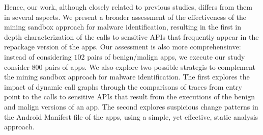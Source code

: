 Hence, our work, although closely related to previous studies, differs from them in several aspects. We present a broader assessment of the effectiveness of the mining sandbox approach for malware identification, resulting in the first in depth characterization of the calls to sensitive APIs that frequently appear in the repackage version of the apps. Our assessment is also more comprehensinve: instead of considering $102$ pairs of benign/malign apps, we execute our study consider {\color{red}800} pairs of apps. We also explore two possible strategis to complement the mining sandbox approach for malware identification. The first explores the impact of dynamic call graphs through the comparisons of traces from entry point to the calls to sensitive APIs that result from the executions of the benign and malign versions of an app. The second explores suspicious change patterns in the Android Manifest file of the apps, using a simple, yet effective, static analysis approach.
